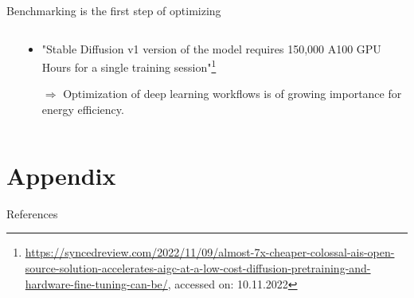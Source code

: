 \documentclass[compress,aspectratio=169]{beamer}
\begin{document}
\begin{frame}{Benchmarking is the first step of optimizing}
\begin{columns}
\begin{column}{0.5\textwidth}
        \end{column}
        \begin{column}{0.5\textwidth}
            \begin{itemize}
                \item "Stable Diffusion v1 version of the model requires 150,000 A100 GPU Hours for a single training session"\footnote{\tiny{\url{https://syncedreview.com/2022/11/09/almost-7x-cheaper-colossal-ais-open-source-solution-accelerates-aigc-at-a-low-cost-diffusion-pretraining-and-hardware-fine-tuning-can-be/}}, accessed on: 10.11.2022}
                \vspace{1em}
                \item[$\Rightarrow$] Optimization of deep learning workflows is of growing importance for energy efficiency.
            \end{itemize}
        \end{column}
    \end{columns}

\end{frame}

\section{Appendix}

\begin{frame}{References}
    \renewcommand*{\bibfont}{\normalfont\scriptsize}
    \printbibliography[heading=none]
\end{frame}
\end{document}

